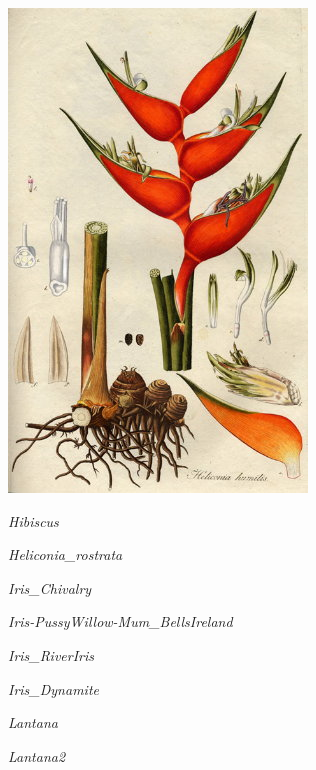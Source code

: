 \documentclass{article}
\begin{document}
\begin{center}
\includegraphics[width=0.9\textheight, angle=90]{../Heliconia_humilisJacquin.jpg}
\end{center}
\newpage

\noindent   
\vfill
\centerline{{\Large\emph{Hibiscus}}}
\vfill
\newpage

\noindent   
\vfill
\centerline{{\Large\emph{Heliconia_rostrata}}}
\vfill
\newpage

\noindent   
\vfill
\centerline{{\Large\emph{Iris_Chivalry}}}
\vfill
\newpage

\noindent   
\vfill
\centerline{{\Large\emph{Iris-PussyWillow-Mum_BellsIreland}}}
\vfill
\newpage

\noindent   
\vfill
\centerline{{\Large\emph{Iris_RiverIris}}}
\vfill
\newpage

\noindent   
\vfill
\centerline{{\Large\emph{Iris_Dynamite}}}
\vfill
\newpage

\noindent   
\vfill
\centerline{{\Large\emph{Lantana}}}
\vfill
\newpage

\noindent   
\vfill
\centerline{{\Large\emph{Lantana2}}}
\vfill
\newpage
\end{document}
